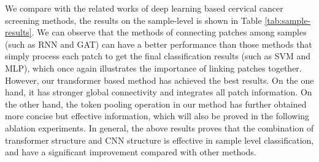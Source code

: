 We compare with the related works of deep learning based cervical cancer screening methods, the results on the sample-level is shown in Table \ref{tab:sample-results}. We can observe that the methods of connecting patches among samples (such as RNN and GAT) can have a better performance than those methods that simply process each patch to get the final classification results (such as SVM and MLP), which once again illustrates the importance of linking patches together. However, our transformer based method has achieved the best results. On the one hand, it has stronger global connectivity and integrates all patch information. On the other hand, the token pooling operation in our method has further obtained more concise but effective information, which will also be proved in the following ablation experiments.
In general, the above results proves that the combination of transformer structure and CNN structure is effective in sample level classification, and have a significant improvement compared with other methods.


